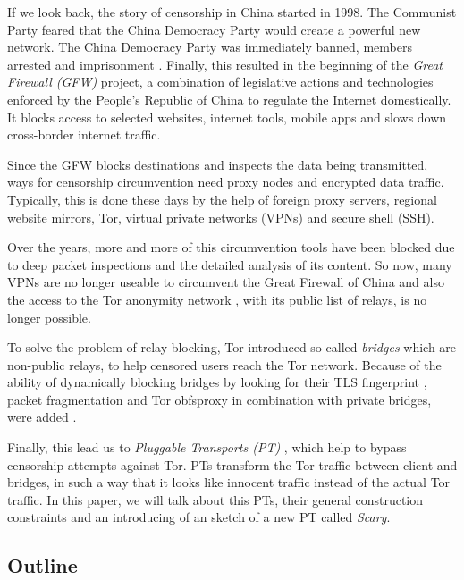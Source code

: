 \documentclass[sigconf, screen]{acmart}
\begin{document}
If we look back, the story of censorship in China started in 1998. The Communist Party feared that the China Democracy Party would create a powerful new network. The China Democracy Party was immediately banned, members arrested and imprisonment \cite{GreatFirewallWikiEn}. Finally, this resulted in the beginning of the \textit{Great Firewall (GFW)} project, a combination of legislative actions and technologies enforced by the People's Republic of China to regulate the Internet domestically. It blocks access to selected websites, internet tools, mobile apps and slows down cross-border internet traffic.

Since the GFW blocks destinations and inspects the data being transmitted, ways for censorship circumvention need proxy nodes and encrypted data traffic. Typically, this is done these days by the help of foreign proxy servers, regional website mirrors, Tor, virtual private networks (VPNs) and secure shell (SSH).

Over the years, more and more of this circumvention tools have been blocked due to deep packet inspections and the detailed analysis of its content. So now, many VPNs are no longer useable to circumvent the Great Firewall of China and also the access to the Tor anonymity network \cite{Tor}, with its public list of relays, is no longer possible. 

To solve the problem of relay blocking, Tor introduced so-called \textit{bridges} \cite{TorBridges} which are non-public relays, to help censored users reach the Tor network. Because of the ability of dynamically blocking bridges by looking for their TLS fingerprint \cite{foci12-winter} \cite{Ensafi2015AnalyzingTG}, packet fragmentation and Tor obfsproxy in combination with private bridges, were added \cite{foci12-winter}.

Finally, this lead us to \textit{Pluggable Transports (PT)} \cite{TorPluggableTransports}, which help to bypass censorship attempts against Tor. PTs transform the Tor traffic between client and bridges, in such a way that it looks like innocent traffic instead of the actual Tor traffic. In this paper, we will talk about this PTs, their general construction constraints and an introducing of an sketch of a new PT called \textit{Scary}.
\subsection{Outline}
\label{ss:outline}
\end{document}

